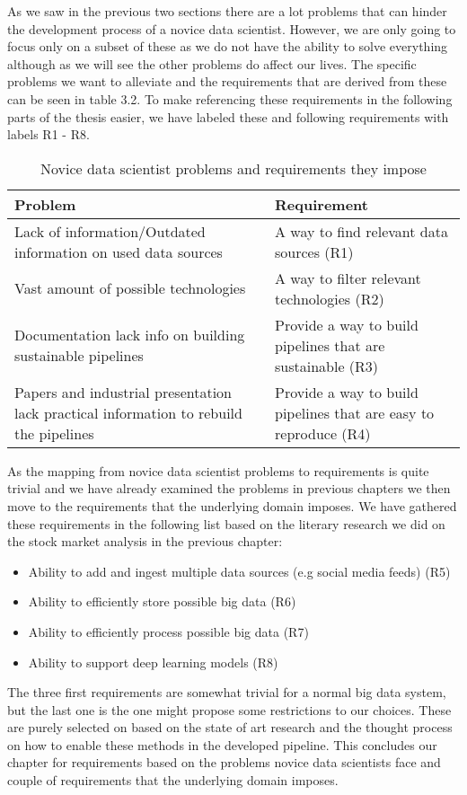 As we saw in the previous two sections there are a lot problems that can hinder the development process of a novice data scientist.
However, we are only going to focus only on a subset of these as we do not have the ability to solve everything although as we will see the other problems do affect our lives.
The specific problems we want to alleviate and the requirements that are derived from these can be seen in table 3.2.
To make referencing these requirements in the following parts of the thesis easier, we have labeled these and following requirements with labels R1 - R8.

\begin{table}[! htbp]\centering 
  \caption{Novice data scientist problems and requirements they impose}
  \begin{threeparttable}
      \begin{tabular}{|p{6cm}|p{6cm}|}
      \hline
      Problem & Requirement \\ \hline
      Lack of information/Outdated information on used data sources &  A way to find relevant data sources (R1)\\ \hline
      Vast amount of possible technologies &  A way to filter relevant technologies (R2)\\ \hline
      Documentation lack info on building sustainable pipelines & Provide a way to build pipelines that are sustainable (R3) \\ \hline
      Papers and industrial presentation lack practical information to rebuild the pipelines & Provide a way to build pipelines that are easy to reproduce (R4)\\ \hline
      \end{tabular}
  \end{threeparttable}
\end{table}

As the mapping from novice data scientist problems to requirements is quite trivial and we have already examined the problems in previous chapters we then move to the requirements that the underlying domain imposes.
We have gathered these requirements in the following list based on the literary research we did on the stock market analysis in the previous chapter:

\begin{itemize}
  \item Ability to add and ingest multiple data sources (e.g social media feeds) (R5)
  \item Ability to efficiently store possible big data (R6)
  \item Ability to efficiently process possible big data (R7)
  \item Ability to support deep learning models (R8)
\end{itemize}

The three first requirements are somewhat trivial for a normal big data system, but the last one is the one might propose some restrictions to our choices.
These are purely selected on based on the state of art research and the thought process on how to enable these methods in the developed pipeline.
This concludes our chapter for requirements based on the problems novice data scientists face and couple of requirements that the underlying domain imposes.
